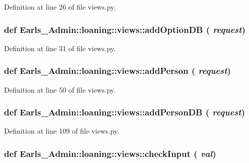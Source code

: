 Definition at line 26 of file views.py.\hypertarget{namespaceEarls__Admin_1_1loaning_1_1views_2ae65fbcff8f695fb2caf848b85e511c}{
\subsubsection[addOptionDB]{\setlength{\rightskip}{0pt plus 5cm}def Earls\_\-Admin::loaning::views::addOptionDB ( {\em request})}}
\label{namespaceEarls__Admin_1_1loaning_1_1views_2ae65fbcff8f695fb2caf848b85e511c}




Definition at line 31 of file views.py.\hypertarget{namespaceEarls__Admin_1_1loaning_1_1views_71b7b9ffceb8b7be82716afe75debc5a}{
\subsubsection[addPerson]{\setlength{\rightskip}{0pt plus 5cm}def Earls\_\-Admin::loaning::views::addPerson ( {\em request})}}
\label{namespaceEarls__Admin_1_1loaning_1_1views_71b7b9ffceb8b7be82716afe75debc5a}




Definition at line 50 of file views.py.\hypertarget{namespaceEarls__Admin_1_1loaning_1_1views_8fdf122909e21d4381c1bab824dfb980}{
\subsubsection[addPersonDB]{\setlength{\rightskip}{0pt plus 5cm}def Earls\_\-Admin::loaning::views::addPersonDB ( {\em request})}}
\label{namespaceEarls__Admin_1_1loaning_1_1views_8fdf122909e21d4381c1bab824dfb980}




Definition at line 109 of file views.py.\hypertarget{namespaceEarls__Admin_1_1loaning_1_1views_6d28375779b939b3cafff337017fdff9}{
\subsubsection[checkInput]{\setlength{\rightskip}{0pt plus 5cm}def Earls\_\-Admin::loaning::views::checkInput ( {\em val})}}
\label{namespaceEarls__Admin_1_1loaning_1_1views_6d28375779b939b3cafff337017fdff9}




